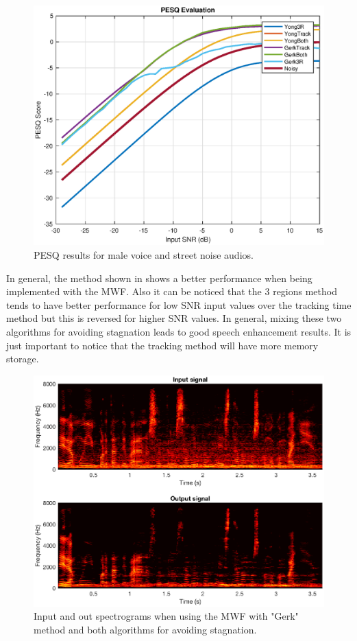 \begin{figure}[!ht]
  \centering
	\includegraphics[width=130mm]{Kap4/MaleN1}
	\caption{PESQ results for male voice and street noise audios.}
	\label{fig:MaleN1}
\end{figure}

In general, the method shown in \cite{Gerkmann2011NoisePresence} shows a better performance when being implemented with the MWF. Also it can be noticed that the 3 regions method tends to have better performance for low SNR input values over the tracking time method but this is reversed for higher SNR values. In general, mixing these two algorithms for avoiding stagnation leads to good speech enhancement results. It is just important to notice that the tracking method will have more memory storage.\\

\begin{figure}[!ht]
  \centering
	\includegraphics[width=140mm]{Kap4/fil1}
	\caption{Input and out spectrograms when using the MWF with "Gerk" method and both algorithms for avoiding stagnation.}
	\label{fig:fil1}
\end{figure}

